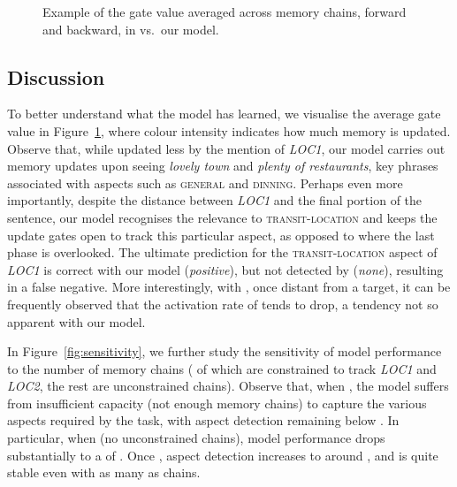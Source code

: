 \documentclass[11pt,a4paper]{article}
\newcommand{\lex}[1]{\textit{#1}\xspace}
\newcommand{\aspect}[1]{\textsc{#1}\xspace}
\newcommand{\figref}[2][]{Figure#1~\ref{#2}\xspace}
\begin{document}
\begin{figure}
\begin{center}
{ }
\end{center}
\caption{\label{fig:analysis} Example of the gate value  averaged across memory chains, forward and backward, in  vs.\ our model.}
\vspace{-30pt}
\end{figure}

\subsection{Discussion} 

To better understand what the model has learned, we visualise the average gate value  in \figref{fig:analysis}, where colour intensity indicates how much memory is updated. Observe that, while updated less by the mention of \textit{LOC1}, our model carries out memory updates upon seeing \textit{lovely town} and \textit{plenty of restaurants}, key phrases associated with aspects such as \aspect{general} and \aspect{dinning}. Perhaps even more importantly, despite the distance between \textit{LOC1} and the final portion of the sentence, our model recognises the relevance to \aspect{transit-location} and keeps the update gates open to track this particular aspect, as opposed to  where the last phase is overlooked. The ultimate prediction for the \aspect{transit-location} aspect of \textit{LOC1} is correct with our model (\textit{positive}), but not detected by  (\textit{none}), resulting in a false negative. More interestingly, with , once distant from a target, it can be frequently observed that the activation rate of  tends to drop, a tendency not so apparent with our model.

In \figref{fig:sensitivity}, we further study the sensitivity of model performance to the number of memory chains  ( of which are constrained to track \lex{LOC1} and \lex{LOC2}, the rest are unconstrained chains). Observe that, when , the model suffers from insufficient capacity (not enough memory chains) to capture the various aspects required by the task, with aspect detection  remaining below . In particular, when  (no unconstrained chains), model performance drops substantially to a  of . Once , aspect detection  increases to around , and is quite stable even with as many as  chains.
\end{document}
